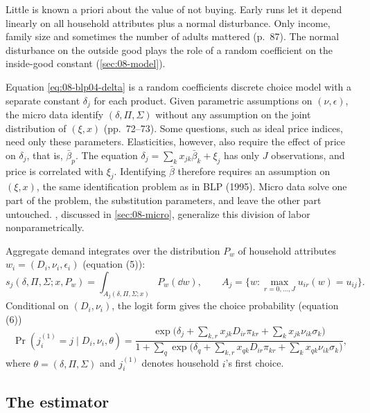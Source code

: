  Little is known a priori about the value of not buying. Early runs let it depend
linearly on all household attributes plus a normal disturbance. Only income, family size and sometimes the
number of adults mattered (p.~87). The normal disturbance on the outside good plays the role of a random
coefficient on the inside-good constant (\cref{sec:08-model}).

 Equation \eqref{eq:08-blp04-delta} is a random coefficients discrete
choice model with a separate constant $\delta_j$ for each product. Given parametric assumptions on
$(\nu,\epsilon)$, the micro data identify $(\delta, \Pi, \Sigma)$ without any assumption on the joint
distribution of $(\xi, x)$ (pp.~72--73). Some questions, such as ideal price indices, need only these
parameters. Elasticities, however, also require the effect of price on $\delta_j$, that is, $\bar\beta_p$. The
equation $\delta_j = \sum_k x_{jk}\bar\beta_k + \xi_j$ has only $J$ observations, and price is correlated with
$\xi_j$. Identifying $\bar\beta$ therefore requires an assumption on $(\xi, x)$, the same identification
problem as in BLP (1995). Micro data solve one part of the problem, the substitution parameters, and leave the
other part untouched. \citet{BerryHaile2024}, discussed in \cref{sec:08-micro}, generalize this division of
labor nonparametrically.

Aggregate demand integrates over the distribution $P_w$ of household attributes $w_i = (D_i, \nu_i,
\epsilon_i)$ (equation (5)):
\[
s_j(\delta, \Pi, \Sigma; x, P_w) = \int_{A_j(\delta, \Pi, \Sigma; x)} P_w(\dd w),
\qquad A_j = \Big\{w : \max_{r = 0,\dots,J} u_{ir}(w) = u_{ij}\Big\}.
\]
Conditional on $(D_i, \nu_i)$, the logit form gives the choice probability (equation (6))
\begin{equation}\label{eq:08-blp04-prob}
\Pr(j^{(1)}_i = j \mid D_i, \nu_i, \theta) =
\frac{\exp\big(\delta_j + \sum_{k,r}x_{jk}D_{ir}\pi_{kr} + \sum_k x_{jk}\nu_{ik}\sigma_k\big)}
{1 + \sum_q \exp\big(\delta_q + \sum_{k,r}x_{qk}D_{ir}\pi_{kr} + \sum_k x_{qk}\nu_{ik}\sigma_k\big)},
\end{equation}
where $\theta = (\delta, \Pi, \Sigma)$ and $j^{(1)}_i$ denotes household $i$'s first choice.

\subsection{The estimator}\label{sec:08-blp04-estimator}

